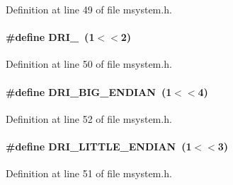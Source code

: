 \begin{DoxyItemize}
\item 
\end{DoxyItemize}

Definition at line 49 of file msystem.h.
\paragraph[{DRI\_\-64}]{\setlength{\rightskip}{0pt plus 5cm}\#define DRI\_~(1$<$$<$2)}\hfill\label{group__msdefineh_gab190dd0e5439f0688e15c8b5312a7e4f}

\begin{DoxyItemize}
\item 
\end{DoxyItemize}

Definition at line 50 of file msystem.h.
\paragraph[{DRI\_\-BIG\_\-ENDIAN}]{\setlength{\rightskip}{0pt plus 5cm}\#define DRI\_\-BIG\_\-ENDIAN~(1$<$$<$4)}\hfill\label{group__msdefineh_gab3ef6d21655a8a91a2fbc6866ae42823}

\begin{DoxyItemize}
\item 
\end{DoxyItemize}

Definition at line 52 of file msystem.h.
\paragraph[{DRI\_\-LITTLE\_\-ENDIAN}]{\setlength{\rightskip}{0pt plus 5cm}\#define DRI\_\-LITTLE\_\-ENDIAN~(1$<$$<$3)}\hfill\label{group__msdefineh_ga488afc1213500e60d6dd9a2939fb3204}

\begin{DoxyItemize}
\item 
\end{DoxyItemize}

Definition at line 51 of file msystem.h.